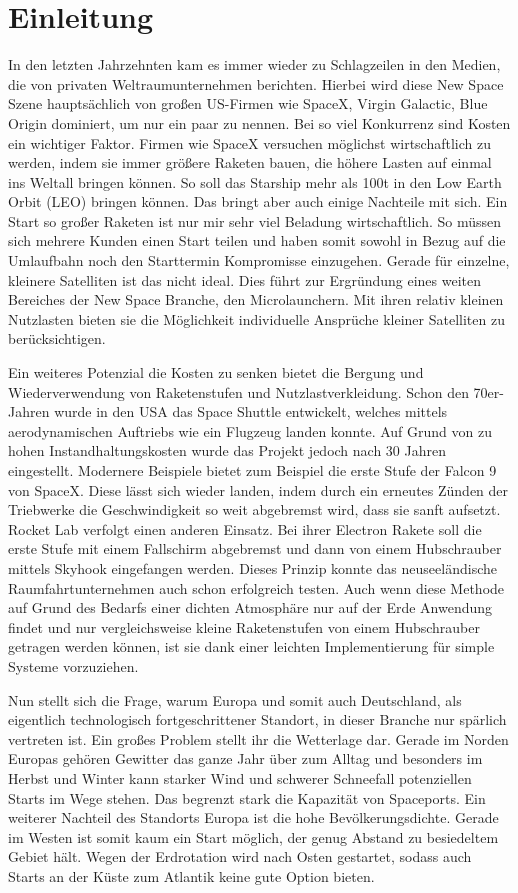 \chapter{Einleitung}

In den letzten Jahrzehnten kam es immer wieder zu Schlagzeilen in den Medien, die von privaten Weltraumunternehmen berichten. Hierbei wird diese New Space Szene hauptsächlich von großen US-Firmen wie SpaceX, Virgin Galactic, Blue Origin dominiert, um nur ein paar zu nennen. Bei so viel Konkurrenz sind Kosten ein wichtiger Faktor. Firmen wie SpaceX versuchen möglichst wirtschaftlich zu werden, indem sie immer größere Raketen bauen, die höhere Lasten auf einmal ins Weltall bringen können. So soll das Starship mehr als 100t in den Low Earth Orbit (LEO) bringen können. Das bringt aber auch einige Nachteile mit sich. Ein Start so großer Raketen ist nur mir sehr viel Beladung wirtschaftlich. So müssen sich mehrere Kunden einen Start teilen und haben somit sowohl in Bezug auf die Umlaufbahn noch den Starttermin Kompromisse einzugehen. Gerade für einzelne, kleinere Satelliten ist das nicht ideal. Dies führt zur Ergründung eines weiten Bereiches der New Space Branche, den Microlaunchern. Mit ihren relativ kleinen Nutzlasten bieten sie die Möglichkeit individuelle Ansprüche kleiner Satelliten zu berücksichtigen.

Ein weiteres Potenzial die Kosten zu senken bietet die Bergung und Wiederverwendung von Raketenstufen und Nutzlastverkleidung. Schon den 70er-Jahren wurde in den USA das Space Shuttle entwickelt, welches mittels aerodynamischen Auftriebs wie ein Flugzeug landen konnte. Auf Grund von zu hohen Instandhaltungskosten wurde das Projekt jedoch nach 30 Jahren eingestellt. Modernere Beispiele bietet zum Beispiel die erste Stufe der Falcon 9 von SpaceX. Diese lässt sich wieder landen, indem durch ein erneutes Zünden der Triebwerke die Geschwindigkeit so weit abgebremst wird, dass sie sanft aufsetzt. Rocket Lab verfolgt einen anderen Einsatz. Bei ihrer Electron Rakete soll die erste Stufe mit einem Fallschirm abgebremst und dann von einem Hubschrauber mittels Skyhook eingefangen werden. Dieses Prinzip konnte das neuseeländische Raumfahrtunternehmen auch schon erfolgreich testen. Auch wenn diese Methode auf Grund des Bedarfs einer dichten Atmosphäre nur auf der Erde Anwendung findet und nur vergleichsweise kleine Raketenstufen von einem Hubschrauber getragen werden können, ist sie dank einer leichten Implementierung für simple Systeme vorzuziehen.

Nun stellt sich die Frage, warum Europa und somit auch Deutschland, als eigentlich technologisch fortgeschrittener Standort, in dieser Branche nur spärlich vertreten ist. Ein großes Problem stellt ihr die Wetterlage dar. Gerade im Norden Europas gehören Gewitter das ganze Jahr über zum Alltag und besonders im Herbst und Winter kann starker Wind und schwerer Schneefall potenziellen Starts im Wege stehen. Das begrenzt stark die Kapazität von Spaceports. Ein weiterer Nachteil des Standorts Europa ist die hohe Bevölkerungsdichte. Gerade im Westen ist somit kaum ein Start möglich, der genug Abstand zu besiedeltem Gebiet hält. Wegen der Erdrotation wird nach Osten gestartet, sodass auch Starts an der Küste zum Atlantik keine gute Option bieten.

